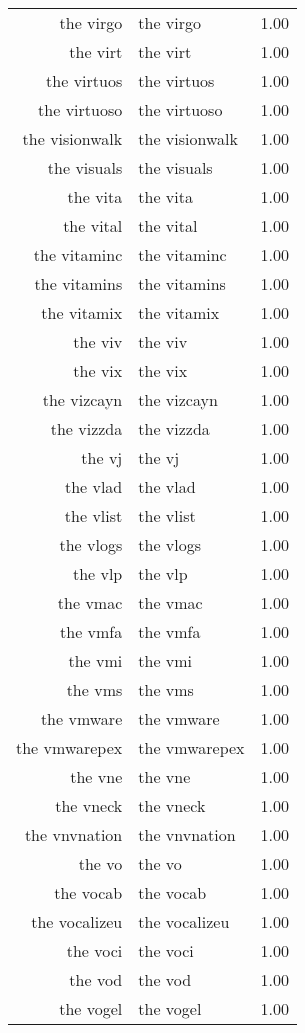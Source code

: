 \begin{table}[ht]
\begin{tabular}{rlr}
  the virgo & the virgo & 1.00 \\ 
  the virt & the virt & 1.00 \\ 
  the virtuos & the virtuos & 1.00 \\ 
  the virtuoso & the virtuoso & 1.00 \\ 
  the visionwalk & the visionwalk & 1.00 \\ 
  the visuals & the visuals & 1.00 \\ 
  the vita & the vita & 1.00 \\ 
  the vital & the vital & 1.00 \\ 
  the vitaminc & the vitaminc & 1.00 \\ 
  the vitamins & the vitamins & 1.00 \\ 
  the vitamix & the vitamix & 1.00 \\ 
  the viv & the viv & 1.00 \\ 
  the vix & the vix & 1.00 \\ 
  the vizcayn & the vizcayn & 1.00 \\ 
  the vizzda & the vizzda & 1.00 \\ 
  the vj & the vj & 1.00 \\ 
  the vlad & the vlad & 1.00 \\ 
  the vlist & the vlist & 1.00 \\ 
  the vlogs & the vlogs & 1.00 \\ 
  the vlp & the vlp & 1.00 \\ 
  the vmac & the vmac & 1.00 \\ 
  the vmfa & the vmfa & 1.00 \\ 
  the vmi & the vmi & 1.00 \\ 
  the vms & the vms & 1.00 \\ 
  the vmware & the vmware & 1.00 \\ 
  the vmwarepex & the vmwarepex & 1.00 \\ 
  the vne & the vne & 1.00 \\ 
  the vneck & the vneck & 1.00 \\ 
  the vnvnation & the vnvnation & 1.00 \\ 
  the vo & the vo & 1.00 \\ 
  the vocab & the vocab & 1.00 \\ 
  the vocalizeu & the vocalizeu & 1.00 \\ 
  the voci & the voci & 1.00 \\ 
  the vod & the vod & 1.00 \\ 
  the vogel & the vogel & 1.00 \\ 

\end{tabular}
\end{table}
